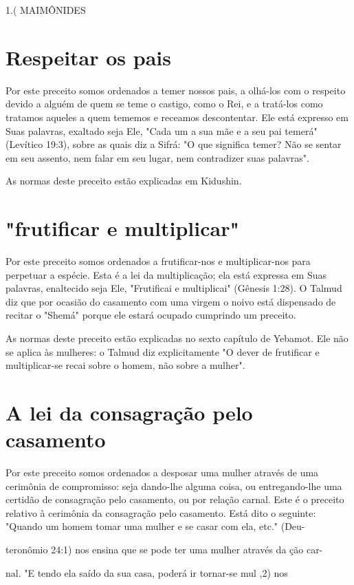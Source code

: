 \begin{itemize}
\begin{enumrate}
\begin{itemize}
\begin{itemize}
\begin{itemize}
1.( MAIMÔNIDES

\section{Respeitar os pais}

Por este preceito somos ordenados a temer nossos pais, a olhá-los com o
respeito devido a alguém de quem se teme o castigo, como o Rei, e a
tratá-los como tratamos aqueles a quem tememos e receamos descontentar.
Ele está expresso em Suas palavras, exaltado seja Ele, "Cada um a sua
mãe e a seu pai temerá" (Levítico 19:3), sobre as quais diz a Sifrá: "O
que significa temer? Não se sentar em seu assento, nem falar em seu
lugar, nem contradizer suas palavras".


As normas deste preceito estão explicadas em Kidushin.


\section{"frutificar e multiplicar"}

Por este preceito somos ordenados a frutificar-nos e multiplicar-nos
para perpetuar a espécie. Esta é a lei da multiplicação; ela está
expressa em Suas palavras, enaltecido seja Ele, "Frutificai e
multiplicai" (Gênesis 1:28). O Talmud diz que por ocasião do casamento
com uma virgem o noivo está dispensado de recitar o "Shemá" porque ele
estará ocupado cumprindo um preceito.

As normas deste preceito estão explicadas no sexto capítulo de Ye­bamot.
Ele não se aplica às mulheres: o Talmud diz explicitamente "O dever de
frutificar e multiplicar-se recai sobre o homem, não sobre a mulher".

\section{A lei da consagração pelo casamento}

Por este preceito somos ordenados a desposar uma mulher através de uma
cerimônia de compromisso: seja dando-lhe alguma coisa, ou entregando-lhe
uma certidão de consagração pelo casamento, ou por relação carnal. Este
é o preceito relativo à cerimônia da consagração pelo casamento. Está
dito o seguinte: "Quando um homem tomar uma mulher e se casar com ela,
etc." (Deu-

teronômio 24:1) nos ensina que se pode ter uma mulher através da ção
car-

nal. "E tendo ela saído da sua casa, poderá ir tornar-se mul ,2) nos


\end{itemize}
\end{itemize}
\end{itemize}
\end{enumrate}
\end{itemize}
